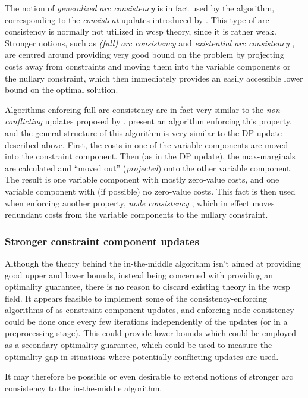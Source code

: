 The notion of \emph{generalized arc consistency} \parencite[\pno~7]{Cooper10} is in fact used by the algorithm, corresponding to the \emph{consistent} updates introduced by \parencite[\pno~101]{Wedelin08}.
This type of arc consistency is normally not utilized in \gls{wcsp} theory, since it is rather weak.
Stronger notions, such as \emph{(full) arc consistency} and \emph{existential arc consistency} \parencite{deGivry05}, are centred around providing very good bound on the problem by projecting costs away from constraints and moving them into the variable components or the nullary constraint, which then immediately provides an easily accessible lower bound on the optimal solution.

Algorithms enforcing full arc consistency are in fact very similar to the \emph{non-conflicting} updates proposed by \textcite{Wedelin08}.
\Textcite[\pno~85\psq]{deGivry05} present an algorithm enforcing this property, and the general structure of this algorithm is very similar to the DP update described above.
First, the costs in one of the variable components are moved into the constraint component.
Then (as in the DP update), the max-marginals are calculated and \enquote{moved out} (\emph{projected}) onto the other variable component.
The result is one variable component with mostly zero-value costs, and one variable component with (if possible) no zero-value costs. 
This fact is then used when enforcing another property, \emph{node consistency} \parencite[\pno~7]{Cooper10}, which in effect moves redundant costs from the variable components to the nullary constraint.

\subsubsection{Stronger constraint component updates}
Although the theory behind the in-the-middle algorithm isn't aimed at providing good upper and lower bounds, instead being concerned with providing an optimality guarantee, there is no reason to discard existing theory in the \gls{wcsp} field.
It appears feasible to implement some of the consistency-enforcing algorithms of \textcite{deGivry05} as constraint component updates, and enforcing node consistency could be done once every few iterations independently of the updates (or in a preprocessing stage).
This could provide lower bounds which could be employed as a secondary optimality guarantee, which could be used to measure the optimality gap in situations where potentially conflicting updates are used.

It may therefore be possible or even desirable to extend notions of stronger arc consistency to the in-the-middle algorithm.
